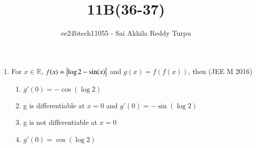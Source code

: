 \documentclass[journal,12pt,twocolumn]{IEEEtran}
\theoremstyle{remark}
\begin{document}

\vspace{3cm}

\title{11B(36-37)}
\author{ee24btech11055 - Sai Akhila Reddy Turpu}
\maketitle
\newpage
\bigskip

\renewcommand{\thefigure}{\theenumi}
\renewcommand{\thetable}{\theenumi}
\begin{enumerate}[start=36]
		


	\item For $x\in\mathbb{R}$, $f(x)=\left\vert\log 2-\sin(x)\right\vert$ and 
	$g(x)=f(f(x))$, then 
	\hfill{(JEE M 2016)}
	\begin{enumerate}[label=(\alph*)]
		\item $g'(0) = -\cos(\log 2)$
		\item g is differentiable at $x=0$ and $g'(0) = -\sin(\log 2)$
		\item g is not differentiable at $x=0$
		\item $g'(0) =  \cos(\log 2)$
	\end{enumerate}


\end{enumerate}
\end{document}
